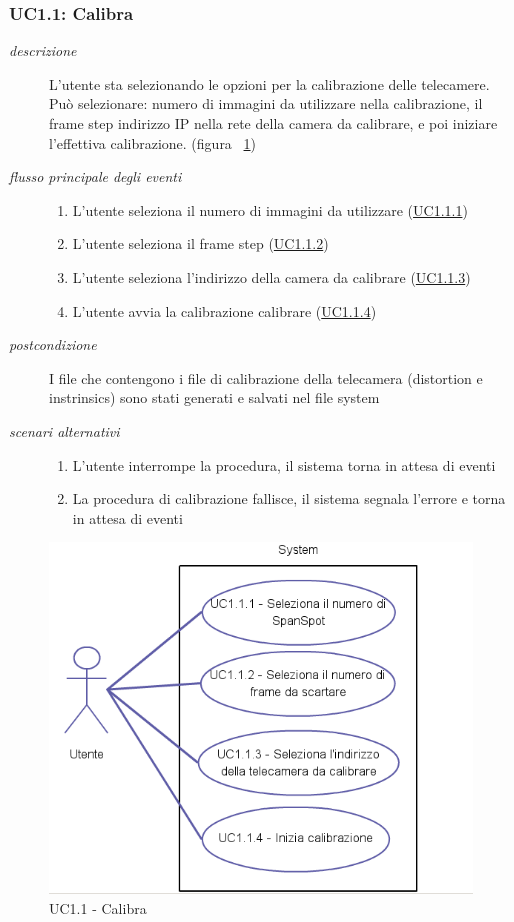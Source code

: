 \subsubsection{UC1.1: Calibra} \label{sec:UC1.1}
\begin{description}
\item[\em{descrizione }]L'utente sta selezionando le opzioni per la calibrazione delle telecamere. Può selezionare: numero di immagini da utilizzare nella calibrazione, il frame step indirizzo IP nella rete della camera da calibrare, e poi iniziare l'effettiva calibrazione. (figura ~\ref{fig:uc1.1})
\item[\em{flusso principale degli eventi }] \mbox{}
\begin{enumerate}
\item L'utente seleziona il numero di immagini da utilizzare (\hyperref[sec:uc1.1.1]{UC1.1.1})
\item L'utente seleziona il frame step (\hyperref[sec:uc1.1.2]{UC1.1.2})
\item L'utente seleziona l'indirizzo della camera da calibrare (\hyperref[sec:uc1.1.3]{UC1.1.3})
\item L'utente avvia la calibrazione calibrare (\hyperref[sec:uc1.1.4]{UC1.1.4})
\end{enumerate}
\item[\em{postcondizione }] I file che contengono i file di calibrazione della telecamera (distortion e instrinsics) sono stati generati e salvati nel file system
\item[\em{scenari alternativi }] \mbox{} 
\begin{enumerate} 
\item L'utente interrompe la procedura, il sistema torna in attesa di eventi
\item La procedura di calibrazione fallisce, il sistema segnala l'errore e torna in attesa di eventi
\end{enumerate}
\end{description}

\begin{figure}[htpb] 
\centering 
\includegraphics[scale=0.4]{./images/uc11.png} 
\caption{UC1.1 - Calibra} 
\label{fig:uc1.1}
\end{figure} 

